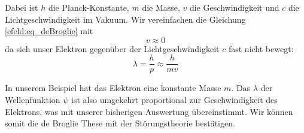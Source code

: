 \begin{refsection}
Dabei ist $h$ die Planck-Konstante, $m$ die Masse, $v$ die Geschwindigkeit
und $c$ die Lichtgeschwindigkeit im Vakuum.
Wir vereinfachen die Gleichung \ref{efeld:eq_deBroglie} mit
\[
  v \approx 0
\]
da sich unser Elektron gegen\"uber der Lichtgeschwindigkeit $c$ fast nicht bewegt:
\begin{equation}
  \lambda = \frac{h}{p} \approx \frac{h}{m v}
\end{equation}

In unserem Beispiel hat das Elektron eine konstante Masse $m$.
Das $\lambda$ der Wellenfunktion $\psi$ ist also umgekehrt proportional zur Geschwindigkeit des Elektrons,
was mit unserer bisherigen Auswertung \"ubereinstimmt.
Wir k\"onnen somit die de Broglie These mit der St\"orungstheorie best\"atigen.







\printbibliography[heading=subbibliography]
\end{refsection}
